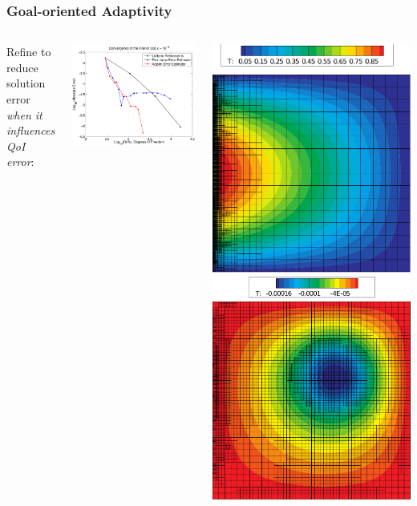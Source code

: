 \documentclass[mathserif]{beamer}
\begin{document}
\begin{frame}
\frametitle{Goal-oriented Adaptivity}

\begin{columns}

Refine to reduce solution error {\emph{when it influences QoI error}}:

\begin{center}
\includegraphics[width=1.0\textwidth]{qoi_may_29_2009_convergence_cropped}
\end{center}


\begin{center}
\includegraphics[height=0.5\textwidth]{QoI_October_20_2011_kelly_mesh}
\includegraphics[height=0.5\textwidth]{QoI_May_29_2009_arpp_mesh+adjoint}
\end{center}


\end{columns}
\end{frame}
\end{document}
